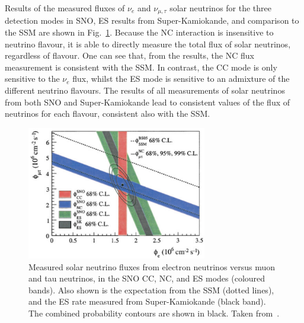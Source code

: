 Results of the measured fluxes of $\nu_{e}$ and $\nu_{\mu,\tau}$ solar neutrinos for the three detection modes in SNO, ES results from Super-Kamiokande, and comparison to the SSM are shown in Fig.~\ref{fig:sno_flux_results}. Because the NC interaction is insensitive to neutrino flavour, it is able to directly measure the total flux of \beight{} solar neutrinos, regardless of flavour. One can see that, from the results, the NC flux measurement is consistent with the SSM. In contrast, the CC mode is only sensitive to the $\nu_{e}$ flux, whilst the ES mode is sensitive to an admixture of the different neutrino flavours. The results of all measurements of solar neutrinos from both SNO and Super-Kamiokande lead to consistent values of the flux of \beight{} neutrinos for each flavour, consistent also with the SSM.

\begin{figure}
    \centering
    \includegraphics[width=0.7\textwidth]{1_NeutrinoTheory/Figs/sno_vs_ssm_comparison.png}
    \caption[Comparison of measured solar neutrino fluxes in the SNO CC, NC, and ES modes to the SSM]
    {Measured solar neutrino fluxes from electron neutrinos versus muon and tau neutrinos, in the SNO CC, NC, and ES modes (coloured bands). Also shown is the expectation from the SSM (dotted lines), and the ES rate measured from Super-Kamiokande (black band). The combined probability contours are shown in black. Taken from~\cite{aharmimElectronEnergySpectra2005}.}
    \label{fig:sno_flux_results}
\end{figure}

